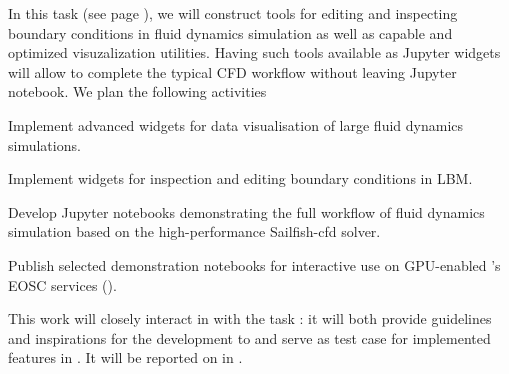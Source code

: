 \begin{task}[
  title=Demonstrator: Visualisation and control of fluid dynamics in Jupyter notebook,
  id=application-gpu,
  lead=SIL,
  PM=12,
  wphases={4-36},
  partners={EGI}
]


In this task (see page \pageref{sec:concept-demonstrator-gpu}), we will construct tools for editing and inspecting boundary conditions in fluid dynamics simulation as well as capable and optimized visuzalization utilities. Having such tools available as Jupyter widgets will allow to complete the typical CFD workflow without leaving Jupyter notebook. We plan the following activities
\begin{compactitem}

\item Implement advanced widgets for data visualisation of large
  fluid dynamics simulations.
\item Implement widgets for inspection and editing boundary
  conditions in LBM.
\item Develop Jupyter notebooks demonstrating the full workflow of  fluid
  dynamics simulation based on the high-performance Sailfish-cfd solver.
  \item Publish selected demonstration notebooks for interactive use on
    GPU-enabled \TheProject's EOSC services ().
\end{compactitem}

This work will closely interact in with the task
: it will both provide guidelines and inspirations
for the development to  and serve
as test case for implemented features in
.
%
  It will be reported on in
  .
\end{task}
